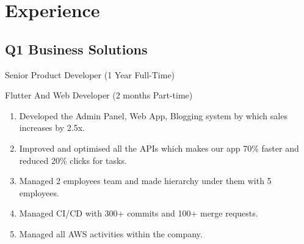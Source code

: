 \documentclass[]{deedy-resume-openfont}
\begin{document}
\begin{minipage}[t]{0.55\textwidth} 


\section{Experience}
\subsection{Q1 Business Solutions}
\sectionsep
\begin{tightemize}
\item Senior Product Developer (1 Year Full-Time)
\end{tightemize}
\hspace{\topsep}

\begin{tightemize}
\item Flutter And Web Developer (2 months Part-time)
\end{tightemize}
\hspace{\topsep}
\begin{enumerate}
\item Developed the Admin Panel, Web App, Blogging system by which sales increases by 2.5x.
\item Improved and optimised all the APIs which makes our app 70\% faster and reduced 20\% clicks for tasks.
\item Managed 2 employees team and made hierarchy under them with 5 employees.
\item Managed CI/CD with 300+ commits and 100+ merge requests.
\item Managed all AWS activities within the company.
\end{enumerate}
\sectionsep





\end{minipage}
\end{document}
